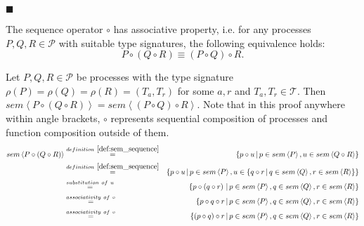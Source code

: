 \begin{myproof}
\hfill$\blacksquare$
\end{myproof}

\begin{theorem}
\label{thm:associativity_sequence}
The sequence operator $\circ$ has associative property, i.e. for any processes $P, Q, R \in \mathcal{P}$ with suitable type signatures, the following equivalence holds:
\begin{equation*}
  P \circ \left( Q \circ R \right) \equiv \left( P \circ Q \right) \circ R.
\end{equation*}
\end{theorem}

\begin{myproof}
Let $P, Q, R \in \mathcal{P}$ be processes with the type signature $\rho \left( P \right) = \rho \left( Q \right) = \rho \left( R \right) = \left( T_a, T_r \right)$ for some $a, r$ and $T_a, T_r \in \mathcal{T}$. Then $sem \left\langle P \circ \left( Q \circ R \right) \right\rangle = sem \left\langle \left( P \circ Q \right) \circ R \right\rangle$. Note that in this proof anywhere within angle brackets, $\circ$ represents sequential composition of processes and function composition outside of them.
\begin{eqnarray*}
  sem \left\langle P \circ \left( Q \circ R \right) \right\rangle & \overset{\defref{def:sem_sequence}}{=} & \left\{ p \circ u \,|\, p \in sem \left\langle P \right\rangle, u \in sem \left\langle Q \circ R \right\rangle \right\} \\
  & \overset{\defref{def:sem_sequence}}{=} & \left\{ p \circ u \,|\, p \in sem \left\langle P \right\rangle, u \in \left\{q \circ r \,|\, q \in sem \left\langle Q \right\rangle, r \in sem \left\langle R \right\rangle \right\} \right\} \\
  & \overset{substitution \ of \ u}{=} & \left\{ p \circ \left( q \circ r \right) \,|\, p \in sem \left\langle P \right\rangle, q \in sem \left\langle Q \right\rangle, r \in sem \left\langle R \right\rangle \right\} \\
  & \overset{associativity \ of \  \circ}{=} & \left\{ p \circ q \circ r \,|\, p \in sem \left\langle P \right\rangle, q \in sem \left\langle Q \right\rangle, r \in sem \left\langle R \right\rangle \right\} \\
  & \overset{associativity \ of \  \circ}{=} & \left\{ \left( p \circ q \right) \circ r \,|\, p \in sem \left\langle P \right\rangle, q \in sem \left\langle Q \right\rangle, r \in sem \left\langle R \right\rangle \right\} \\

\end{eqnarray*}
\end{myproof}
